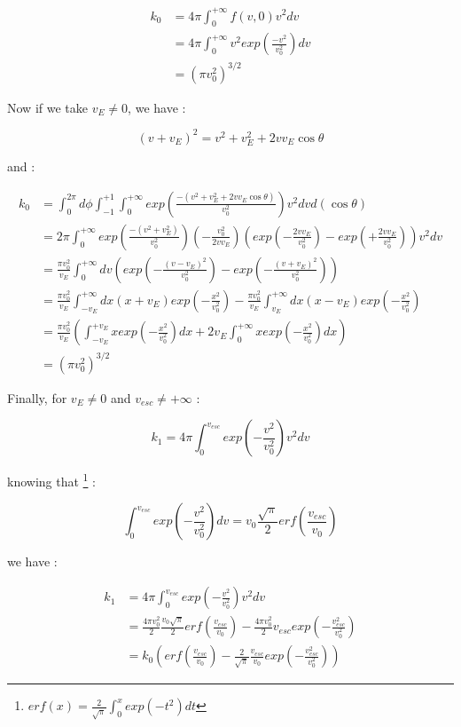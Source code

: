 \documentclass[a4paper, twoside, openany, 11pt]{book}
\begin{document}
\begin{align*}
k_0&=4\pi \int_0^{+\infty} f(v,0) v^2 dv \\
&=4\pi \int_0^{+\infty} v^2 exp(\frac{-v^2}{v_0 ^2}) dv \\
&=(\pi v_0^2)^{3/2}
\end{align*}

Now if we take $ v_E \neq 0 $, we have : 

\begin{equation*}
(v +v_E)^2 = v^2+v_E ^2 + 2 v v_E \cos \theta 
\end{equation*}

and :

\begin{align*}
k_0&=\int_0^{2\pi} d\phi \int_{-1}^{+1} \int_0^{+\infty} exp(\frac{-(v^2+v_E^2 + 2 vv_E \cos \theta)}{v_0 ^2}) v^2 dv d(\cos \theta) \\
&= 2\pi \int_0^{+\infty}  exp(\frac{-(v^2+v_E^2)}{v_0^2})( - \frac{v_0^2}{2vv_E })(exp(-\frac{2vv_E}{v_0^2})-exp(+\frac{2vv_E}{v_0^2}))v^2 dv \\
&=\frac{\pi v_0^2}{v_E} \int_0^{+\infty} dv (exp(-\frac{(v-v_E)^2}{v_0^2})-exp(-\frac{(v+v_E)^2}{v_0^2})) \\
&= \frac{\pi v_0^2}{v_E} \int_{-v_E}^{+\infty} dx (x+v_E)exp(-\frac{x^2}{v_0^2}) -\frac{\pi v_0^2}{v_E} \int_{v_E}^{+\infty} dx (x-v_E)exp(-\frac{x^2}{v_0^2}) \\
&= \frac{\pi v_0^2}{v_E} (\int_{-v_E}^{+v_E} x exp(-\frac{x^2}{v_0^2}) dx + 2v_E \int_{0}^{+\infty} x exp(-\frac{x^2}{v_0^2}) dx) \\
&=(\pi v_0^2)^{3/2}
\end{align*}

Finally, for  $ v_E \neq 0 $ and $ v_{esc} \neq +\infty $ : 

\begin{equation*}
k_1=4\pi \int_{0}^{v_{esc}} exp(-\frac{v^2}{v_0 ^2}) v^2 dv 
\end{equation*}

knowing that \footnote{$ erf(x)=\frac{2}{\sqrt{\pi}} \int_0 ^x exp(-t^2)dt $} : 

\begin{equation*}
 \int_{0}^{v_{esc}} exp(-\frac{v^2}{v_0^2}) dv  = v_0 \frac{\sqrt{\pi}}{2} erf(\frac{v_{esc}}{v_0})
\end{equation*}

we have :

\begin{align*}
k_1&=4\pi \int_{0}^{v_{esc}} exp(-\frac{v^2}{v_0^2})v^2dv \\
&= \frac{4\pi v_0^2}{2}\frac{v_0\sqrt{\pi}}{2}erf(\frac{v_{esc}}{v_0})- \frac{4\pi v_0^2}{2}v_{esc}exp(-\frac{v_{esc}^2}{v_0^2}) \\
&=k_0(erf(\frac{v_{esc}}{v_0}) - \frac{2}{\sqrt{\pi}} \frac{v_{esc}}{v_0}exp(-\frac{v_{esc}^2}{v_0^2}))
\end{align*}
\end{document}
